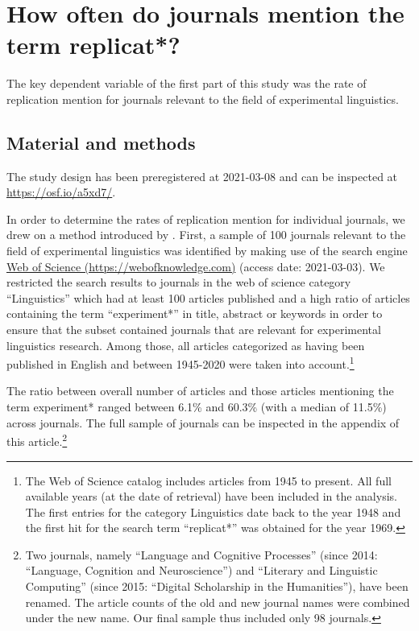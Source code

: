 \documentclass[cm,linguex]{glossa}
\begin{document}
\hypertarget{how-often-do-journals-mention-the-term-replicat}{%
\section{How often do journals mention the term replicat*?}\label{how-often-do-journals-mention-the-term-replicat}}

The key dependent variable of the first part of this study was the rate of replication mention for journals relevant to the field of experimental linguistics.

\hypertarget{material-and-methods}{%
\subsection{Material and methods}\label{material-and-methods}}

The study design has been preregistered at 2021-03-08 and can be inspected at \url{https://osf.io/a5xd7/}.

In order to determine the rates of replication mention for individual journals, we drew on a method introduced by \citet{makel_replications_2012}.
First, a sample of 100 journals relevant to the field of experimental linguistics was identified by making use of the search engine \href{https://webofknowledge.com}{Web of Science (https://webofknowledge.com)} (access date: 2021-03-03). We restricted the search results to journals in the web of science category ``Linguistics'' which had at least 100 articles published and a high ratio of articles containing the term ``experiment*'' in title, abstract or keywords in order to ensure that the subset contained journals that are relevant for experimental linguistics research. Among those, all articles categorized as having been published in English and between 1945-2020 were taken into account.\footnote{The Web of Science catalog includes articles from 1945 to present. All full available years (at the date of retrieval) have been included in the analysis. The first entries for the category Linguistics date back to the year 1948 and the first hit for the search term ``replicat*'' was obtained for the year 1969.}

The ratio between overall number of articles and those articles mentioning the term experiment* ranged between 6.1\% and 60.3\% (with a median of 11.5\%) across journals.
The full sample of journals can be inspected in the appendix of this article.\footnote{Two journals, namely ``Language and Cognitive Processes'' (since 2014: ``Language, Cognition and Neuroscience'') and ``Literary and Linguistic Computing'' (since 2015: ``Digital Scholarship in the Humanities''), have been renamed. The article counts of the old and new journal names were combined under the new name. Our final sample thus included only 98 journals.}
\end{document}
